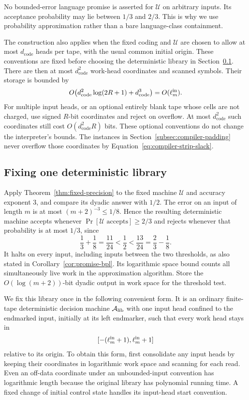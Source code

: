 No bounded-error language promise is asserted for ${\mathcal U}$ on arbitrary
inputs.  Its acceptance probability may lie between $1/3$ and $2/3$.
This is why we use probability approximation rather than a bare
language-class containment.

\begin{remark}
The construction also applies when the fixed coding and ${\mathcal U}$ are chosen
to allow at most $d_{\mathrm{code}}$ heads per tape, with the usual common
initial origin. These conventions are fixed before choosing the
deterministic library in Section~\ref{subsec:compiler-library}.
There are then at most $d_{\mathrm{code}}^2$ work-head coordinates and
scanned symbols.  Their storage is bounded by
\[
 O\bigl(d_{\mathrm{code}}^2\log(2R+1)
          +d_{\mathrm{code}}^3\bigr)=O(\ell_m^{\rm in}).
\]
For multiple input heads, or an optional entirely blank tape whose
cells are not charged, use signed $R$-bit coordinates and reject on
overflow.  At most $d_{\mathrm{code}}^2$ such coordinates still cost
$O(d_{\mathrm{code}}^2R)$ bits.  These optional conventions do not
change the interpreter's bounds. The instances in
Section~\ref{subsec:compiler-padding} never overflow those coordinates
by Equation~\eqref{eq:compiler-strip-slack}.
\end{remark}

\subsection{Fixing one deterministic library}
\label{subsec:compiler-library}

Apply Theorem~\ref{thm:fixed-precision} to the fixed machine ${\mathcal U}$ and
accuracy exponent $3$, and compare its dyadic answer with $1/2$.
The error on an input of length $m$ is at most
$(m+2)^{-3}\le1/8$.  Hence the resulting deterministic machine accepts
whenever $\Pr[{\mathcal U}\text{ accepts}]\ge2/3$ and rejects whenever that
probability is at most $1/3$, since
\[
 \frac13+\frac18=\frac{11}{24}<\frac12
   <\frac{13}{24}=\frac23-\frac18.
\]
It halts on every input, including inputs between the two thresholds,
as also stated in Corollary~\ref{cor:promise-bpl}.  Its logarithmic
space bound counts all simultaneously live work in the approximation
algorithm.  Store the $O(\log(m+2))$-bit dyadic output in work space
for the threshold test.

We fix this library once in the following convenient form.  It is an
ordinary finite-tape deterministic decision machine ${\mathcal A_{\rm lib}}$ with one input
head confined to the endmarked input, initially at its left endmarker,
such that every work head stays in
\begin{equation}\label{eq:compiler-library-box}
 [-(\ell_m^{\rm in}+1),\ell_m^{\rm in}+1]
\end{equation}
relative to its origin.  To obtain this form, first consolidate any
input heads by keeping their coordinates in logarithmic work space
and scanning for each read.  Even an off-data coordinate under an
unbounded-input convention has logarithmic length because the original
library has polynomial running time.  A fixed change of initial control
state handles its input-head start convention.

